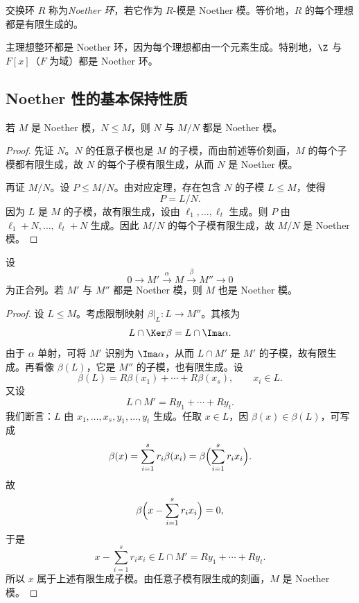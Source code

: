 \begin{definition}
交换环 $R$ 称为\emph{Noether 环}，若它作为 $R$-模是 Noether 模。等价地，$R$ 的每个理想都是有限生成的。
\end{definition}

\begin{example}
主理想整环都是 Noether 环，因为每个理想都由一个元素生成。特别地，$\Z$ 与 $F[x]$（$F$ 为域）都是 Noether 环。
\end{example}

\subsection{Noether 性的基本保持性质}

\begin{proposition}
若 $M$ 是 Noether 模，$N\le M$，则 $N$ 与 $M/N$ 都是 Noether 模。
\end{proposition}

\begin{proof}
先证 $N$。$N$ 的任意子模也是 $M$ 的子模，而由前述等价刻画，$M$ 的每个子模都有限生成，故 $N$ 的每个子模有限生成，从而 $N$ 是 Noether 模。

再证 $M/N$。设 $P\le M/N$。由对应定理，存在包含 $N$ 的子模 $L\le M$，使得
\[
P=L/N.
\]
因为 $L$ 是 $M$ 的子模，故有限生成，设由 $\ell_1,\dots,\ell_t$ 生成。则 $P$ 由 $\ell_1+N,\dots,\ell_t+N$ 生成。因此 $M/N$ 的每个子模有限生成，故 $M/N$ 是 Noether 模。
\end{proof}

\begin{proposition}
设
\[
0\longrightarrow M'\xrightarrow{\alpha} M\xrightarrow{\beta} M''\longrightarrow 0
\]
为正合列。若 $M'$ 与 $M''$ 都是 Noether 模，则 $M$ 也是 Noether 模。
\end{proposition}

\begin{proof}
设 $L\le M$。考虑限制映射 $\beta|_L\colon L\to M''$。其核为
\[
L\cap \Ker\beta=L\cap \Ima\alpha.
\]
由于 $\alpha$ 单射，可将 $M'$ 识别为 $\Ima\alpha$，从而 $L\cap M'$ 是 $M'$ 的子模，故有限生成。再看像 $\beta(L)$，它是 $M''$ 的子模，也有限生成。设
\[
\beta(L)=R\beta(x_1)+\cdots+R\beta(x_s),\qquad x_i\in L.
\]
又设
\[
L\cap M'=Ry_1+\cdots+Ry_t.
\]
我们断言：$L$ 由 $x_1,\dots,x_s,y_1,\dots,y_t$ 生成。任取 $x\in L$，因 $\beta(x)\in \beta(L)$，可写成
\[
\beta(x)=\sum_{i=1}^s r_i\beta(x_i)=\beta\Bigl(\sum_{i=1}^s r_ix_i\Bigr).
\]
故
\[
\beta\Bigl(x-\sum_{i=1}^s r_ix_i\Bigr)=0,
\]
于是
\[
x-\sum_{i=1}^s r_ix_i\in L\cap M'=Ry_1+\cdots+Ry_t.
\]
所以 $x$ 属于上述有限生成子模。由任意子模有限生成的刻画，$M$ 是 Noether 模。
\end{proof}

